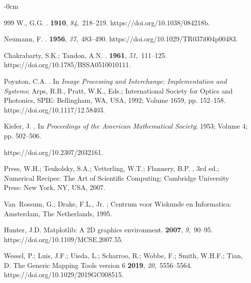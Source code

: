 \documentclass[sensors,article,accept,moreauthors,pdftex]{Definitions/mdpi}
\begin{document}
\begin{adjustwidth}{-\extralength}{0cm}
\begin{thebibliography}{999}
W., G.G.
.
 {\bf 1910}, {\em 84},~218--219.
\newblock
{https://doi.org/10.1038/084218b}.

Neumann, F.
.
 {\bf 1956}, {\em 37},~483--490.
\linebreak
{https://doi.org/10.1029/TR037i004p00483}.

Chakrabarty, S.K.; Tandon, A.N.
.
 {\bf 1961},
  {\em 51},~111--125.
\newblock
{https://doi.org/10.1785/BSSA0510010111}.

Poynton, C.A.
.
\newblock  In \emph{Image Processing and Interchange: Implementation and Systems}; Arps,
  R.B., Pratt, W.K., Eds.; International Society for Optics and Photonics, SPIE:  Bellingham, WA, USA, 1992; Volume 1659, pp. 152--158.
\newblock
{https://doi.org/10.1117/12.58403}.

Kiefer, J.
.
\newblock In {\em Proceedings of the American Mathematical Society}; 1953; Volume 4; pp. 502--506.
\newblock %

 {https://doi.org/10.2307/2032161}.

Press, W.H.; Teukolsky, S.A.; Vetterling, W.T.; Flannery, B.P.
, 3rd ed.;
  Numerical Recipes: The Art of Scientific Computing; Cambridge University
  Press: New York, NY, USA,  2007.

Van~Rossum, G.; Drake, F.L., Jr.
; Centrum voor Wiskunde en Informatica:
  Amsterdam, The Netherlands, 1995.

Hunter, J.D.
\newblock Matplotlib: A 2D graphics environment.
 {\bf 2007}, {\em
  9},~90--95.
\newblock
{https://doi.org/10.1109/MCSE.2007.55}.

 Wessel, P.; Luis, J.F.; Uieda, L.; Scharroo, R.; Wobbe, F.; Smith, W.H.F.; Tian, D. 
\newblock The Generic Mapping Tools version 6
 {\bf 2019}, {\em
  20},~5556--5564.
\newblock
{https://doi.org/10.1029/2019GC008515}.

\end{thebibliography}

\PublishersNote{}
\end{adjustwidth}
\end{document}
